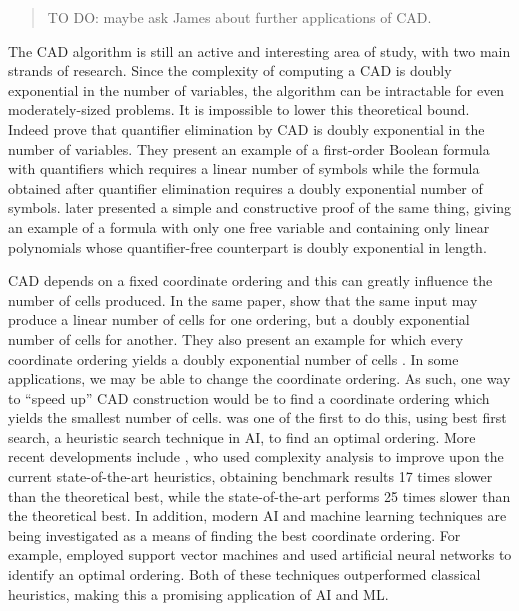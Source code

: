\documentclass[
]{book}
\theoremstyle{definition}
\theoremstyle{definition}
\theoremstyle{definition}
\theoremstyle{definition}
\theoremstyle{remark}
\begin{document}
\begin{quote}
TO DO: maybe ask James about further applications of CAD.
\end{quote}

The CAD algorithm is still an active and interesting area of study, with two main strands of research. Since the complexity of computing a CAD is doubly exponential in the number of variables, the algorithm can be intractable for even moderately-sized problems. It is impossible to lower this theoretical bound. Indeed \citet{davenportHeintz1988} prove that quantifier elimination by CAD is doubly exponential in the number of variables.
They present an example of a first-order Boolean formula with quantifiers which requires a linear number of symbols while the formula obtained after quantifier elimination requires a doubly exponential number of symbols.
\citet{brown07} later presented a simple and constructive proof of the same thing, giving an example of a formula with only one free variable and containing only linear polynomials whose quantifier-free counterpart is doubly exponential in length.

CAD depends on a fixed coordinate ordering and this can greatly influence the number of cells produced. In the same paper, \citet{brown07} show that the same input may produce a linear number of cells for one ordering, but a doubly exponential number of cells for another. They also present an example for which every coordinate ordering yields a doubly exponential number of cells \citep{brown07}.
In some applications, we may be able to change the coordinate ordering. As such, one way to ``speed up'' CAD construction would be to find a coordinate ordering which yields the smallest number of cells. \citet{hong1993} was one of the first to do this, using best first search, a heuristic search technique in AI, to find an optimal ordering. More recent developments include \citet{delrio2022}, who used complexity analysis to improve upon the current state-of-the-art heuristics, obtaining benchmark results 17 times slower than the theoretical best, while the state-of-the-art performs 25 times slower than the theoretical best.
In addition, modern AI and machine learning techniques are being investigated as a means of finding the best coordinate ordering. For example, \citet{huang2014} employed support vector machines and \citet{chen2020} used artificial neural networks to identify an optimal ordering.
Both of these techniques outperformed classical heuristics, making this a promising application of AI and ML.
\end{document}
